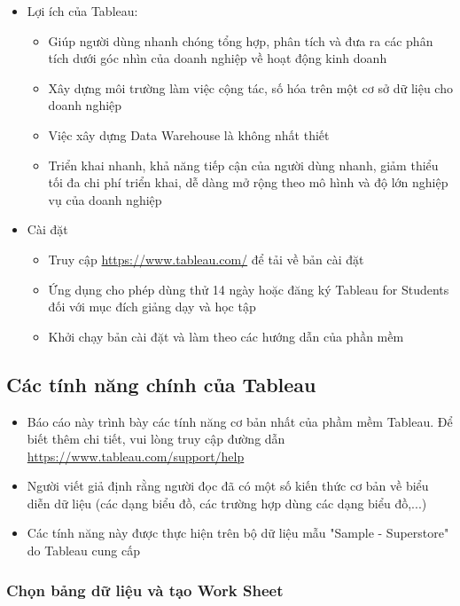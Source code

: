 \documentclass[a4paper, 12pt]{article}
\begin{document}
\begin{itemize}
    \item Lợi ích của Tableau:
    \begin{itemize}
        \item Giúp người dùng nhanh chóng tổng hợp, phân tích và đưa ra các phân tích dưới góc nhìn của doanh nghiệp về hoạt động kinh doanh
        \item Xây dựng môi trường làm việc cộng tác, số hóa trên một cơ sở dữ liệu cho doanh nghiệp
        \item Việc xây dựng Data Warehouse là không nhất thiết
        \item Triển khai nhanh, khả năng tiếp cận của người dùng nhanh, giảm thiểu tối đa chi phí triển khai, dễ dàng mở rộng theo mô hình và độ lớn nghiệp vụ của doanh nghiệp
    \end{itemize}

    \item Cài đặt
    \begin{itemize}
        \item Truy cập \url{https://www.tableau.com/} để tải về bản cài đặt
        \item Ứng dụng cho phép dùng thử 14 ngày hoặc đăng ký Tableau for Students đối với mục đích giảng dạy và học tập
        \item Khởi chạy bản cài đặt và làm theo các hướng dẫn của phần mềm
    \end{itemize}
\end{itemize}

\subsection{Các tính năng chính của Tableau}

\begin{itemize}
    \item Báo cáo này trình bày các tính năng cơ bản nhất của phầm mềm Tableau. Để biết thêm chi tiết, vui lòng truy cập đường dẫn \url{https://www.tableau.com/support/help}
    \item Người viết giả định rằng người đọc đã có một số kiến thức cơ bản về biểu diễn dữ liệu (các dạng biểu đồ, các trường hợp dùng các dạng biểu đồ,...)
    \item Các tính năng này được thực hiện trên bộ dữ liệu mẫu "Sample - Superstore" do Tableau cung cấp
\end{itemize}

\subsubsection{Chọn bảng dữ liệu và tạo Work Sheet}
\end{document}
